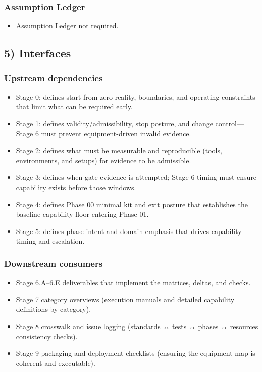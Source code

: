 \documentclass[10pt]{article}
\begin{document}
\subsubsection*{Assumption Ledger}

\begin{itemize}
\item Assumption Ledger not required.
\end{itemize}

\subsection*{5) Interfaces}

\subsubsection*{Upstream dependencies}

\begin{itemize}
\item Stage 0: defines start-from-zero reality, boundaries, and operating constraints that limit what can be required early.
\item Stage 1: defines validity/admissibility, stop posture, and change control—Stage 6 must prevent equipment-driven invalid evidence.
\item Stage 2: defines what must be measurable and reproducible (tools, environments, and setups) for evidence to be admissible.
\item Stage 3: defines when gate evidence is attempted; Stage 6 timing must ensure capability exists before those windows.
\item Stage 4: defines Phase 00 minimal kit and exit posture that establishes the baseline capability floor entering Phase 01.
\item Stage 5: defines phase intent and domain emphasis that drives capability timing and escalation.
\end{itemize}

\subsubsection*{Downstream consumers}

\begin{itemize}
\item Stage 6.A–6.E deliverables that implement the matrices, deltas, and checks.
\item Stage 7 category overviews (execution manuals and detailed capability definitions by category).
\item Stage 8 crosswalk and issue logging (standards ↔ tests ↔ phases ↔ resources consistency checks).
\item Stage 9 packaging and deployment checklists (ensuring the equipment map is coherent and executable).
\end{itemize}
\end{document}
